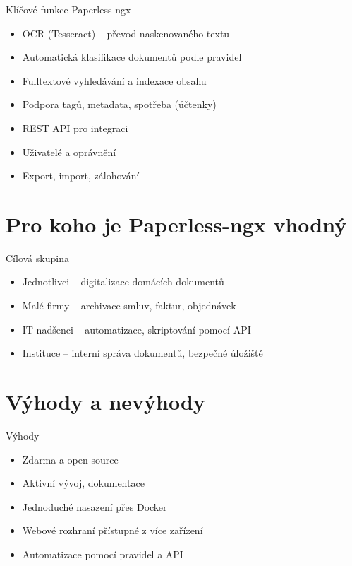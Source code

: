 \documentclass{beamer}
\begin{document}
\begin{frame}{Klíčové funkce Paperless-ngx}
  \begin{itemize}
    \item OCR (Tesseract) – převod naskenovaného textu
    \item Automatická klasifikace dokumentů podle pravidel
    \item Fulltextové vyhledávání a indexace obsahu
    \item Podpora tagů, metadata, spotřeba (účtenky)
    \item REST API pro integraci
    \item Uživatelé a oprávnění
    \item Export, import, zálohování
  \end{itemize}
\end{frame}

\section{Pro koho je Paperless-ngx vhodný}

\begin{frame}{Cílová skupina}
  \begin{itemize}
    \item Jednotlivci – digitalizace domácích dokumentů
    \item Malé firmy – archivace smluv, faktur, objednávek
    \item IT nadšenci – automatizace, skriptování pomocí API
    \item Instituce – interní správa dokumentů, bezpečné úložiště
  \end{itemize}
\end{frame}

\section{Výhody a nevýhody}

\begin{frame}{Výhody}
  \begin{itemize}
    \item Zdarma a open-source
    \item Aktivní vývoj, dokumentace
    \item Jednoduché nasazení přes Docker
    \item Webové rozhraní přístupné z více zařízení
    \item Automatizace pomocí pravidel a API
  \end{itemize}
\end{frame}
\end{document}
